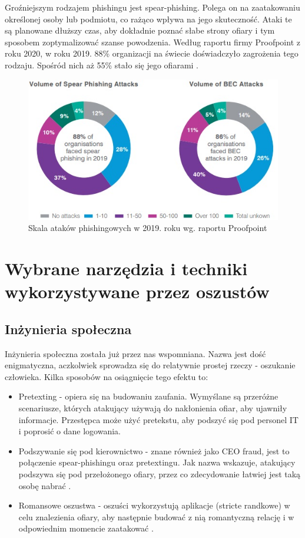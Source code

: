 \documentclass[]{article}
\begin{document}
Groźniejszym rodzajem phishingu jest spear-phishing. Polega on na zaatakowaniu określonej osoby lub podmiotu, co rażąco wpływa na jego skuteczność. Ataki te są planowane dłuższy czas, aby dokładnie poznać słabe strony ofiary i tym sposobem zoptymalizować szanse powodzenia. Według raportu firmy Proofpoint z roku 2020, w roku 2019. 88\% organizacji na świecie doświadczyło zagrożenia tego rodzaju. Spośród nich aż 55\% stało się jego ofiarami \cite{proofpoint2020}.

\begin{figure}
	\centering
	\includegraphics[width=0.8\linewidth]{Pictures/proofpoint_phishing2019.jpg}
	\caption{Skala ataków phishingowych w 2019. roku wg. raportu Proofpoint}
	\label{fig:pp_phishing2019}
\end{figure}

\newpage
\section{Wybrane narzędzia i techniki wykorzystywane przez oszustów}

\subsection{Inżynieria społeczna}
Inżynieria społeczna została już przez nas wspomniana. Nazwa jest dość enigmatyczna, aczkolwiek sprowadza się do relatywnie prostej rzeczy - oszukanie człowieka. Kilka sposobów na osiągnięcie tego efektu to:
\begin{itemize}[label=$\rightarrow$]
	\item Pretexting - opiera się na budowaniu zaufania. Wymyślane są przeróżne scenariusze, których atakujący używają do nakłonienia ofiar, aby ujawniły informacje. Przestępca może użyć pretekstu, aby podszyć się pod personel IT i poprosić o dane logowania.
	\item Podszywanie się pod kierownictwo - znane również jako CEO fraud, jest to połączenie spear-phishingu oraz pretextingu. Jak nazwa wskazuje, atakujący podszywa się pod przełożonego ofiary, przez co zdecydowanie łatwiej jest taką osobę nabrać .
	\item Romansowe oszustwa - oszuści wykorzystują aplikacje (stricte randkowe) w celu znalezienia ofiary, aby następnie budować z nią romantyczną relację i w odpowiednim momencie zaatakować \cite{abnormal_phishingtypes}.
\end{itemize} 
\end{document}
